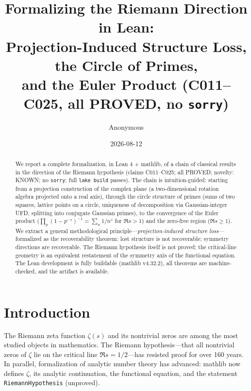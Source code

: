 \documentclass[sigplan,10pt,anonymous,review]{acmart}
\begin{document}
\title{Formalizing the Riemann Direction in Lean:\\
Projection-Induced Structure Loss, the Circle of Primes,\\
and the Euler Product (C011--C025, all PROVED, no \texttt{sorry})}

\author{Anonymous}


\date{2026-08-12}

\begin{abstract}
We report a complete formalization, in Lean 4 + mathlib, of a chain of classical
results in the direction of the Riemann hypothesis (claims C011--C025; all PROVED;
novelty: KNOWN; no \texttt{sorry}; full \texttt{lake build} passes). The chain is
intuition-guided: starting from a projection construction of the complex plane
(a two-dimensional rotation algebra projected onto a real axis), through the circle
structure of primes (sums of two squares, lattice points on a circle, uniqueness of
decomposition via Gaussian-integer UFD, splitting into conjugate Gaussian primes),
to the convergence of the Euler product ($\prod_p (1-p^{-s})^{-1} = \sum_n 1/n^s$
for $\Re s > 1$) and the zero-free region ($\Re s \ge 1$). We extract a general
methodological principle---\emph{projection-induced structure loss}---formalized as
the recoverability theorem: lost structure is not recoverable; symmetry directions
are recoverable. The Riemann hypothesis itself is not proved; the critical-line
geometry is an equivalent restatement of the symmetry axis of the functional
equation. The Lean development is fully buildable (mathlib v4.32.2), all theorems
are machine-checked, and the artifact is available.
\end{abstract}


\maketitle

\section{Introduction}

The Riemann zeta function $\zeta(s)$ and its nontrivial zeros are among the most
studied objects in mathematics. The Riemann hypothesis---that all nontrivial zeros
of $\zeta$ lie on the critical line $\Re s = 1/2$---has resisted proof for over 160
years. In parallel, formalization of analytic number theory has advanced: mathlib
now defines $\zeta$, its analytic continuation, the functional equation, and the
statement \texttt{RiemannHypothesis} (unproved).
\end{document}
